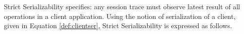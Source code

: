 \documentclass{sig-alternate-05-2015}
\begin{document}
  \par Strict Serializability specifies: any session trace must observe latest result of all operations in a client application. Using the notion of serialization of a client, given in Equation \ref{def:clientser},
  Strict Serializability is expressed as follows. \\
\end{document}
